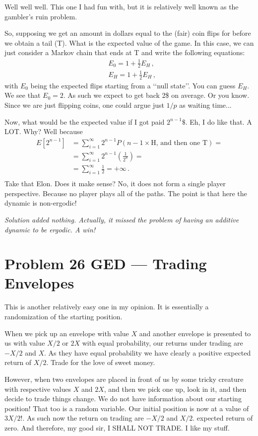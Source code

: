 \documentclass{article}
\begin{document}
Well well well. This one I had fun with, but it is relatively well known as the gambler's ruin problem. 

So, supposing we get an amount in dollars equal to the (fair) coin flips for before we obtain a tail (T). What is the expected value of the game. In this case, we can just consider a Markov chain that ends at T and write the following equations: 
\begin{align*}
    &E_{0} = 1 + \frac{1}{2}E_H \, ,\\
    &E_{H} = 1 + \frac{1}{2}E_H \, ,
\end{align*}
with $E_0$ being the expected flips starting from a \lq\lq null state\rq\rq. You can guess $E_H$. We see that $E_0 = 2$. As such we expect to get back 2\$ on average. Or you know. Since we are just flipping coins, one could argue just $1/p$ as waiting time...

Now, what would be the expected value if I got paid $2^{n-1}\$$. Eh, I do like that. A LOT. Why? Well because
\begin{align*}
    E[2^{n-1}] &= \sum_{i = 1}^{\infty}2^{n-1}P(n-1 \times \text{H, and then one T}) = \\
    & = \sum_{i = 1}^{\infty}2^{n-1}\left(\frac{1}{2^n}\right) = \\& = \sum_{i = 1}^{\infty}\frac{1}{2} = +\infty \, .\\
\end{align*}
Take that Elon. Does it make sense? No, it does not form a single player perspective. Because no player plays all of the paths. The point is that here the dynamic is non-ergodic! 

\textit{Solution added nothing. Actually, it missed the problem of having an additive dynamic to be ergodic. A win!}

\section{Problem 26 GED --- Trading Envelopes}

This is another relatively easy one in my opinion. It is essentially a randomization of the starting position. 

When we pick up an envelope with value $X$ and another envelope is presented to us with value $X/2$ or $2X$ with equal probability, our returns under trading are $-X/2$ and $X$. As they have equal probability we have clearly a positive expected return of $X/2$. Trade for the love of sweet money.

However, when two envelopes are placed in front of us by some tricky creature with respective values $X$ and $2X$, and then we pick one up, look in it, and then decide to trade things change. We do not have information about our starting position! That too is a random variable. Our initial position is now at a value of $3X/2$!. As such now the return on trading are $-X/2$ and $X/2$. expected return of zero. And therefore, my good sir, I SHALL NOT TRADE. I like my stuff.
\end{document}
